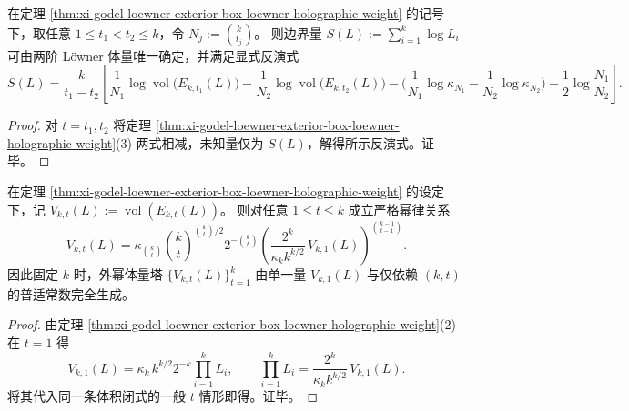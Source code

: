 \begin{corollary}\label{cor:xi-godel-loewner-two-level-holographic-inversion}
在定理 \ref{thm:xi-godel-loewner-exterior-box-loewner-holographic-weight} 的记号下，取任意 \(1\le t_1<t_2\le k\)，令 \(N_j:=\binom{k}{t_j}\)。
则边界量
\(
S(L):=\sum_{i=1}^{k}\log L_i
\)
可由两阶 Löwner 体量唯一确定，并满足显式反演式
\[
S(L)=\frac{k}{t_1-t_2}\left[
\frac{1}{N_1}\log\operatorname{vol}\bigl(E_{k,t_1}(L)\bigr)-\frac{1}{N_2}\log\operatorname{vol}\bigl(E_{k,t_2}(L)\bigr)
-\Big(\frac{1}{N_1}\log\kappa_{N_1}-\frac{1}{N_2}\log\kappa_{N_2}\Big)
-\frac12\log\frac{N_1}{N_2}
\right].
\]
\end{corollary}
\begin{proof}
对 \(t=t_1,t_2\) 将定理 \ref{thm:xi-godel-loewner-exterior-box-loewner-holographic-weight}(3) 两式相减，未知量仅为 \(S(L)\)，解得所示反演式。证毕。
\end{proof}

\begin{proposition}\label{prop:xi-godel-loewner-volume-renormalization-power-law}
在定理 \ref{thm:xi-godel-loewner-exterior-box-loewner-holographic-weight} 的设定下，记 \(V_{k,t}(L):=\operatorname{vol}(E_{k,t}(L))\)。
则对任意 \(1\le t\le k\) 成立严格幂律关系
\[
V_{k,t}(L)
=
\kappa_{\binom{k}{t}}\binom{k}{t}^{\binom{k}{t}/2}2^{-\binom{k}{t}}
\left(\frac{2^{k}}{\kappa_{k}k^{k/2}}\,V_{k,1}(L)\right)^{\binom{k-1}{t-1}}.
\]
因此固定 \(k\) 时，外幂体量塔 \(\{V_{k,t}(L)\}_{t=1}^{k}\) 由单一量 \(V_{k,1}(L)\) 与仅依赖 \((k,t)\) 的普适常数完全生成。
\end{proposition}
\begin{proof}
由定理 \ref{thm:xi-godel-loewner-exterior-box-loewner-holographic-weight}(2) 在 \(t=1\) 得
\[
V_{k,1}(L)=\kappa_k\,k^{k/2}2^{-k}\prod_{i=1}^{k}L_i,
\qquad
\prod_{i=1}^{k}L_i=\frac{2^{k}}{\kappa_k k^{k/2}}\,V_{k,1}(L).
\]
将其代入同一条体积闭式的一般 \(t\) 情形即得。证毕。
\end{proof}

